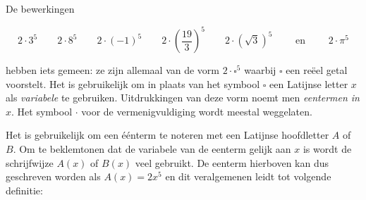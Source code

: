 \documentclass{ximera}
\begin{document}
	\author{Koen de Naeghel - Wiskunde Op Maat}

	


De bewerkingen

\[
2\cdot 3^5
\qquad 2\cdot 8^5
\qquad 2\cdot (-1)^5
\qquad 2\cdot\left(\frac{19}{3}\right)^5
\qquad 2\cdot\left(\sqrt{3}\right)^5 
\qquad \text{ en } \qquad 2 \cdot \pi^5
\]


hebben iets gemeen: ze zijn allemaal van de vorm $2\cdot \square^5$ waarbij $\square$ een reëel getal voorstelt. Het is gebruikelijk om in plaats van het symbool $\square$ een Latijnse letter $x$ als \textit{ variabele} te gebruiken. Uitdrukkingen van deze vorm noemt men \textit{ eentermen in $x$}. Het symbool $\cdot$ voor de vermenigvuldiging wordt meestal weggelaten. 

Het is gebruikelijk om een éénterm te noteren met een Latijnse hoofdletter $A$ of $B$. Om te beklemtonen dat de variabele van de eenterm gelijk aan $x$  is wordt de schrijfwijze $A(x)$ of $B(x)$ veel gebruikt. De eenterm hierboven kan dus geschreven worden als $A(x) = 2x^5$ en dit veralgemenen leidt tot volgende definitie:

\end{document}
